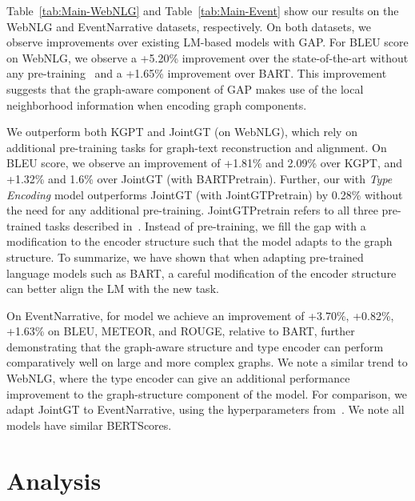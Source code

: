 \documentclass[11pt]{article}
\begin{document}
Table~\ref{tab:Main-WebNLG} and Table~\ref{tab:Main-Event} show our results on the WebNLG and EventNarrative datasets, respectively. On both datasets, we observe improvements over existing LM-based models with GAP. For BLEU score on WebNLG, we observe a +5.20\% improvement over the state-of-the-art without any pre-training~\cite{shimorina2018handling} and a +1.65\% improvement over BART. This improvement suggests that the graph-aware component of GAP makes use of the local neighborhood information when encoding graph components. 

We outperform both KGPT and JointGT (on WebNLG), which rely on additional pre-training tasks for graph-text reconstruction and alignment. On BLEU score, we observe an improvement of +1.81\% and 2.09\% over KGPT, and +1.32\% and 1.6\% over JointGT (with BARTPretrain). Further, our  with \textit{Type Encoding} model outperforms JointGT (with JointGTPretrain) by 0.28\% without the need for any additional pre-training. JointGTPretrain refers to all three pre-trained tasks described in~\citet{ke-etal-2021-jointgt}. Instead of pre-training, we fill the gap with a modification to the encoder structure such that the model adapts to the graph structure. To summarize, we have shown that when adapting pre-trained language models such as BART, a careful modification of the encoder structure can better align the LM with the new task.

On EventNarrative, for model  we achieve an improvement of +3.70\%, +0.82\%, +1.63\% on BLEU, METEOR, and ROUGE, relative to BART, further demonstrating that the graph-aware structure and type encoder can perform comparatively well on large and more complex graphs. We note a similar trend to WebNLG, where the type encoder can give an additional performance improvement to the graph-structure component of the model. For comparison, we adapt JointGT to EventNarrative, using the hyperparameters from~\citet{ke-etal-2021-jointgt}. We note all models have similar BERTScores.

\section{Analysis}
\end{document}

